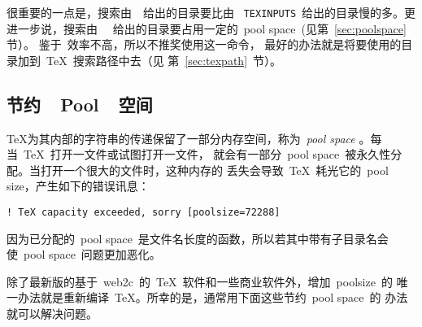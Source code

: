 很重要的一点是，搜索由~~给出的目录要比由
~\texttt{TEXINPUTS}~给出的目录慢的多。更进一步说，搜索由~~
给出的目录要占用一定的~pool space~(见第~\ref{sec:poolspace}节）。
鉴于~效率不高，所以不推奖使用这一命令，
最好的办法就是将要使用的目录加到~\TeX{}~搜索路径中去（见
第~\ref{sec:texpath}~节）。

\subsection{节约~~Pool~~空间}\label{ssec:poolspace}

\TeX{}为其内部的字符串的传递保留了一部分内存空间，称为~\textit{pool space}
。每当~\TeX{}~打开一文件或试图打开一文件，
就会有一部分~pool space~被永久性分配。当打开一个很大的文件时，这种内存的
丢失会导致~\TeX~耗光它的~pool size，产生如下的错误讯息：
\begin{Verbatim}[xleftmargin=1cm]
! TeX capacity exceeded, sorry [poolsize=72288]
\end{Verbatim}
因为已分配的~pool space~是文件名长度的函数，所以若其中带有子目录名会
使~pool space~问题更加恶化。

除了最新版的基于~web2c~的~\TeX{}~软件和一些商业软件外，增加~poolsize~的
唯一办法就是重新编译~\TeX{}。所幸的是，通常用下面这些节约~pool space~的
办法就可以解决问题。


